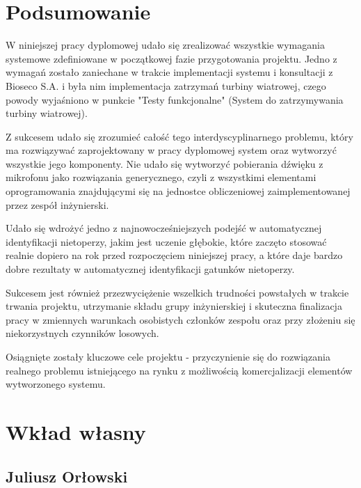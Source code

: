 \documentclass{sprz}
\begin{document}
\chapter{Podsumowanie}
W niniejszej pracy dyplomowej udało się zrealizować wszystkie wymagania systemowe zdefiniowane w początkowej fazie przygotowania projektu. Jedno z wymagań zostało zaniechane w trakcie implementacji systemu i konsultacji z Bioseco S.A. i była nim implementacja zatrzymań turbiny wiatrowej, czego powody wyjaśniono w punkcie "Testy funkcjonalne" (System do zatrzymywania turbiny wiatrowej). 


Z sukcesem udało się zrozumieć całość tego interdyscyplinarnego problemu, który ma rozwiązywać zaprojektowany w pracy dyplomowej system oraz wytworzyć wszystkie jego komponenty. Nie udało się wytworzyć pobierania dźwięku z mikrofonu jako rozwiązania generycznego, czyli z wszystkimi elementami oprogramowania znajdującymi się na jednostce obliczeniowej zaimplementowanej przez zespół inżynierski. 


Udało się wdrożyć jedno z najnowocześniejszych podejść w automatycznej identyfikacji nietoperzy, jakim jest uczenie głębokie, które zaczęto stosować realnie dopiero na rok przed rozpoczęciem niniejszej pracy, a które daje bardzo dobre rezultaty w automatycznej identyfikacji gatunków nietoperzy.

Sukcesem jest również przezwyciężenie wszelkich trudności powstałych w trakcie trwania projektu, utrzymanie składu grupy inżynierskiej i skuteczna finalizacja pracy w zmiennych warunkach osobistych członków zespołu oraz przy złożeniu się niekorzystnych czynników losowych.

Osiągnięte zostały kluczowe cele projektu - przyczynienie się do rozwiązania realnego problemu istniejącego na rynku z możliwością komercjalizacji elementów wytworzonego systemu. 

\chapter{Wkład własny}

\section{Juliusz Orłowski}
\end{document}
